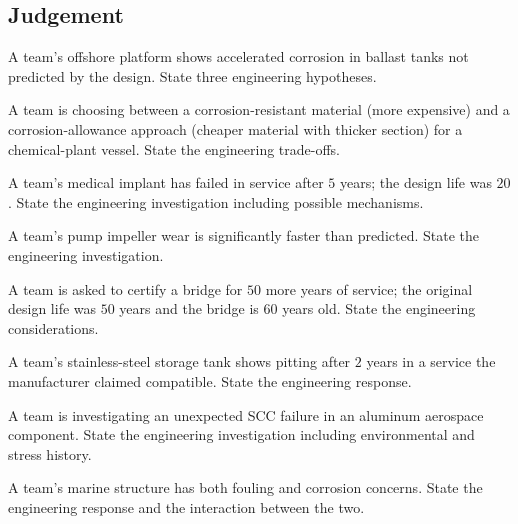 \subsection*{Judgement}

\begin{exercise}
A team's offshore platform shows accelerated corrosion in ballast tanks not predicted by the design. State three engineering hypotheses.
\end{exercise}

\begin{exercise}
A team is choosing between a corrosion-resistant material (more expensive) and a corrosion-allowance approach (cheaper material with thicker section) for a chemical-plant vessel. State the engineering trade-offs.
\end{exercise}

\begin{exercise}
A team's medical implant has failed in service after $5$ years; the design life was $20$. State the engineering investigation including possible mechanisms.
\end{exercise}

\begin{exercise}
A team's pump impeller wear is significantly faster than predicted. State the engineering investigation.
\end{exercise}

\begin{exercise}
A team is asked to certify a bridge for $50$ more years of service; the original design life was $50$ years and the bridge is $60$ years old. State the engineering considerations.
\end{exercise}

\begin{exercise}
A team's stainless-steel storage tank shows pitting after $2$ years in a service the manufacturer claimed compatible. State the engineering response.
\end{exercise}

\begin{exercise}
A team is investigating an unexpected SCC failure in an aluminum aerospace component. State the engineering investigation including environmental and stress history.
\end{exercise}

\begin{exercise}
A team's marine structure has both fouling and corrosion concerns. State the engineering response and the interaction between the two.
\end{exercise}
